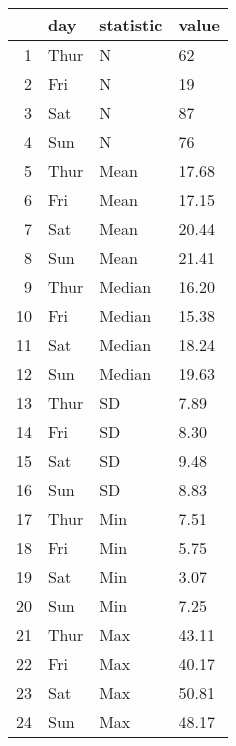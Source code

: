 \documentclass{article}
\begin{document}
\begin{table}[ht]
\centering
\begin{tabular}{rlll}
  \hline
 & day & statistic & value \\ 
  \hline
1 & Thur & N & 62 \\ 
  2 & Fri & N & 19 \\ 
  3 & Sat & N & 87 \\ 
  4 & Sun & N & 76 \\ 
  5 & Thur & Mean & 17.68 \\ 
  6 & Fri & Mean & 17.15 \\ 
  7 & Sat & Mean & 20.44 \\ 
  8 & Sun & Mean & 21.41 \\ 
  9 & Thur & Median & 16.20 \\ 
  10 & Fri & Median & 15.38 \\ 
  11 & Sat & Median & 18.24 \\ 
  12 & Sun & Median & 19.63 \\ 
  13 & Thur & SD & 7.89 \\ 
  14 & Fri & SD & 8.30 \\ 
  15 & Sat & SD & 9.48 \\ 
  16 & Sun & SD & 8.83 \\ 
  17 & Thur & Min & 7.51 \\ 
  18 & Fri & Min & 5.75 \\ 
  19 & Sat & Min & 3.07 \\ 
  20 & Sun & Min & 7.25 \\ 
  21 & Thur & Max & 43.11 \\ 
  22 & Fri & Max & 40.17 \\ 
  23 & Sat & Max & 50.81 \\ 
  24 & Sun & Max & 48.17 \\ 
   \hline
\end{tabular}
\end{table}
\end{document}

